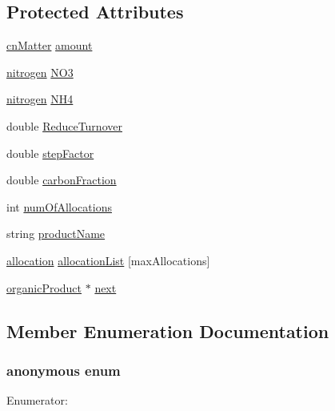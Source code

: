 \subsection*{Protected Attributes}
\begin{DoxyCompactItemize}
\item 
\hyperlink{classcn_matter}{cnMatter} \hyperlink{classorganic_product_a1eba4729932fc4050b9a32c848f22248}{amount}
\item 
\hyperlink{classnitrogen}{nitrogen} \hyperlink{classorganic_product_aa137691fa72af0fdb0c79267a00ba09f}{NO3}
\item 
\hyperlink{classnitrogen}{nitrogen} \hyperlink{classorganic_product_aca69b6ed87c9760c2b848dc8a398d6d1}{NH4}
\item 
double \hyperlink{classorganic_product_a28373067ddc34d2b19c3891943d9695d}{ReduceTurnover}
\item 
double \hyperlink{classorganic_product_a72c71b42022333fe698ba1b4114f12e0}{stepFactor}
\item 
double \hyperlink{classorganic_product_abf93f684bb0111a45f3682fa96d9c738}{carbonFraction}
\item 
int \hyperlink{classorganic_product_a2a6b42a4ee2b65f7c6da110630df0a04}{numOfAllocations}
\item 
string \hyperlink{classorganic_product_a8c1958c15d3faca177a1cc54b347f5e8}{productName}
\item 
\hyperlink{structorganic_product_1_1allocation}{allocation} \hyperlink{classorganic_product_a1009688debdb12952259390ce6b761ad}{allocationList} \mbox{[}maxAllocations\mbox{]}
\item 
\hyperlink{classorganic_product}{organicProduct} $\ast$ \hyperlink{classorganic_product_a1fd373bd20bdba2e2637c3550f20af52}{next}
\end{DoxyCompactItemize}


\subsection{Member Enumeration Documentation}
\hypertarget{classorganic_product_a7d49b54ed2c7f92fce2e3f35115e1c22}{
\subsubsection[{"@30}]{\setlength{\rightskip}{0pt plus 5cm}anonymous enum}}
\label{classorganic_product_a7d49b54ed2c7f92fce2e3f35115e1c22}
\begin{Desc}
\item[Enumerator: ]\par
\begin{description}
\item[{\em 
\hypertarget{classorganic_product_a7d49b54ed2c7f92fce2e3f35115e1c22a061bb9fd136515aaad1613f6d80923a2}{
maxAllocations}
\label{classorganic_product_a7d49b54ed2c7f92fce2e3f35115e1c22a061bb9fd136515aaad1613f6d80923a2}
}]\end{description}
\end{Desc}



